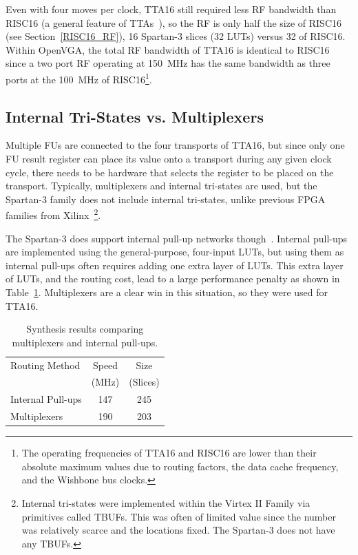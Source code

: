 Even with four moves per clock, TTA16 still required less RF bandwidth than
RISC16 (a general feature of TTAs~\cite{hoogerbrugge1994rfp}), so the RF is only
half the size of RISC16 (see Section~\ref{RISC16_RF}), 16 Spartan-3 slices (32
LUTs) versus 32 of RISC16. Within OpenVGA, the total RF bandwidth of TTA16 is
identical to RISC16 since a two port RF operating at 150~MHz has the same
bandwidth as three ports at the 100~MHz of RISC16\footnote{The operating
frequencies of TTA16 and RISC16 are lower than their absolute maximum values due
to routing factors, the data cache frequency, and the Wishbone bus clocks.}.


\subsection{Internal Tri-States vs. Multiplexers}
Multiple FUs are connected to the four transports of TTA16, but since only one FU
result register can place its value onto a transport during any given clock
cycle, there needs to be hardware that selects the register to be placed on the
transport. Typically, multiplexers and internal tri-states are used, but the
Spartan-3 family does not include internal tri-states, unlike previous FPGA
families from Xilinx~\cite{Xilinx_SP3_DS}\footnote{Internal tri-states were
implemented within the Virtex II Family via primitives called TBUFs. This was
often of limited value since the number was relatively scarce and the locations
fixed. The Spartan-3 does not have any TBUFs.}.

The Spartan-3 does support internal pull-up networks though~\cite{Xilinx_SP3_DS}.
Internal pull-ups are implemented using the general-purpose, four-input LUTs, but
using them as internal pull-ups often requires adding one extra layer of LUTs.
This extra layer of LUTs, and the routing cost, lead to a large performance
penalty as shown in Table~\ref{TTA_Routing_Network}. Multiplexers are a clear win
in this situation, so they were used for TTA16.

\begin{table}[h!]
\begin{center}
\begin{tabular}{l c c}
Routing Method	& Speed & Size \\
				& (MHz) & (Slices) \\
\hline
Internal Pull-ups & 147 & 245 \\
Multiplexers & 190 & 203 \\
\end{tabular}
\caption[Synthesis results comparing multiplexers and internal
pull-ups]{Synthesis results comparing multiplexers and internal pull-ups.}
\label{TTA_Routing_Network}
\end{center}
\end{table}



